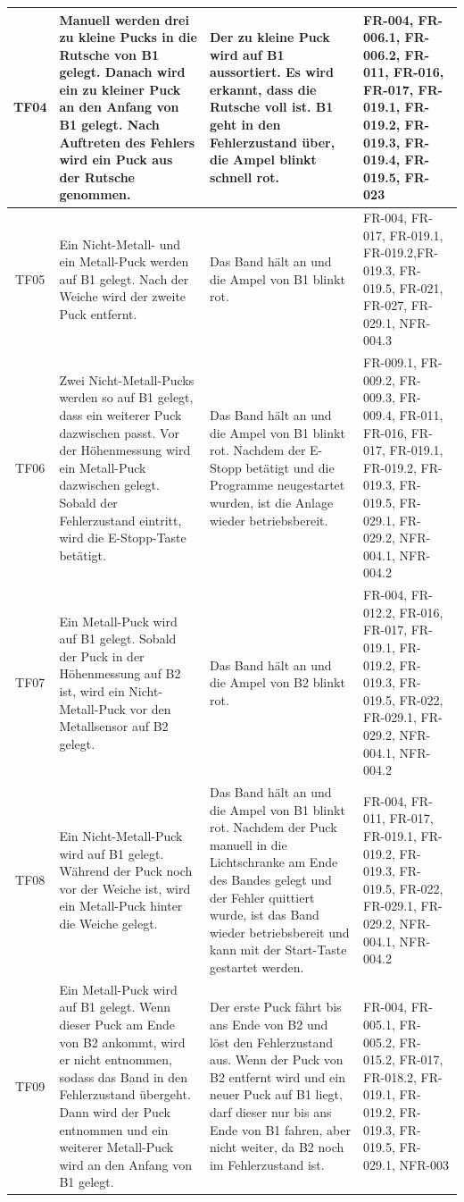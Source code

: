 \documentclass[oneside,a4paper,titlepage]{scrartcl}              %
\begin{document}
\begin{small}
\begin{center}
\begin{longtable}{|c|p{4cm}|p{6cm}|C{3cm}|}
      \hline
       TF04 & Manuell werden drei zu kleine Pucks in die Rutsche von B1 gelegt. Danach wird ein zu kleiner Puck an den Anfang von B1 gelegt. Nach Auftreten des Fehlers wird ein Puck aus der Rutsche genommen. & Der zu kleine Puck wird auf B1 aussortiert. Es wird erkannt, dass die Rutsche voll ist. B1 geht in den Fehlerzustand über, die Ampel blinkt schnell rot. & FR-004, FR-006.1, FR-006.2, FR-011, FR-016, FR-017, FR-019.1, FR-019.2, FR-019.3, FR-019.4, FR-019.5, FR-023\\
      \hline
      TF05 & Ein Nicht-Metall- und ein Metall-Puck werden auf B1 gelegt. Nach der Weiche wird der zweite Puck entfernt. & Das Band hält an und die Ampel von B1 blinkt rot. &FR-004, FR-017, FR-019.1, FR-019.2,FR-019.3, FR-019.5, FR-021, FR-027, FR-029.1, NFR-004.3\\
      \hline
       TF06 & Zwei Nicht-Metall-Pucks werden so auf B1 gelegt, dass ein weiterer Puck dazwischen passt. Vor der Höhenmessung wird ein Metall-Puck dazwischen gelegt. Sobald der Fehlerzustand eintritt, wird die E-Stopp-Taste betätigt. & Das Band hält an und die Ampel von B1 blinkt rot. Nachdem der E-Stopp betätigt und die Programme neugestartet wurden, ist die Anlage wieder betriebsbereit. & FR-009.1, FR-009.2, FR-009.3, FR-009.4, FR-011, FR-016, FR-017, FR-019.1, FR-019.2, FR-019.3, FR-019.5, FR-029.1, FR-029.2, NFR-004.1, NFR-004.2\\
      \hline
      TF07 & Ein Metall-Puck wird auf B1 gelegt. Sobald der Puck in der Höhenmessung auf B2 ist, wird ein Nicht-Metall-Puck vor den Metallsensor auf B2 gelegt. & Das Band hält an und die Ampel von B2 blinkt rot. & FR-004, FR-012.2, FR-016, FR-017, FR-019.1, FR-019.2, FR-019.3, FR-019.5, FR-022, FR-029.1, FR-029.2, NFR-004.1, NFR-004.2\\
      \hline
       TF08 & Ein Nicht-Metall-Puck wird auf B1 gelegt. Während der Puck noch vor der Weiche ist, wird ein Metall-Puck hinter die Weiche gelegt. & Das Band hält an und die Ampel von B1 blinkt rot. Nachdem der Puck manuell in die Lichtschranke am Ende des Bandes gelegt und der Fehler quittiert wurde, ist das Band wieder betriebsbereit und kann mit der Start-Taste gestartet werden. & FR-004, FR-011, FR-017, FR-019.1, FR-019.2, FR-019.3, FR-019.5, FR-022, FR-029.1, FR-029.2, NFR-004.1, NFR-004.2\\
      \hline
      TF09 & Ein Metall-Puck wird auf B1 gelegt. Wenn dieser Puck am Ende von B2 ankommt, wird er nicht entnommen, sodass das Band in den Fehlerzustand übergeht. Dann wird der Puck entnommen und ein weiterer Metall-Puck wird an den Anfang von B1 gelegt. & Der erste Puck fährt bis ans Ende von B2 und löst den Fehlerzustand aus. Wenn der Puck von B2 entfernt wird und ein neuer Puck auf B1 liegt, darf dieser nur bis ans Ende von B1 fahren, aber nicht weiter, da B2 noch im Fehlerzustand ist. & FR-004, FR-005.1, FR-005.2, FR-015.2, FR-017, FR-018.2, FR-019.1, FR-019.2, FR-019.3, FR-019.5, FR-029.1, NFR-003\\

\end{longtable}
\end{center}
\end{small}
\end{document}
